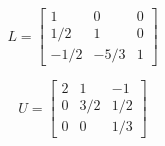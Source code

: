 


\[
L=\left[
\begin{array}{ccc}
1 & 0 & 0 \\
1/2 & 1 & 0\\
-1/2 & -5/3 & 1
\end{array}
\right]
\]

\[
U=\left[
\begin{array}{ccc}
 2& 1 & -1 \\
 0 & 3/2 & 1/2 \\
  0 &0 & 1/3
\end{array}
\right]
\]
